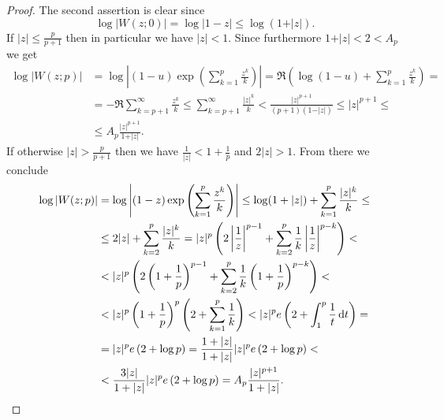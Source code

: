 \begin{proof}
    The second assertion is clear since
    $$ \log \vert W(z; 0) \vert = \log \vert 1 - z \vert \leq \log (1 + \vert z \vert). $$
    If $\vert z \vert \leq \frac{p}{p+1}$ then in particular we have $\vert z \vert < 1$. Since furthermore $1 + \vert z \vert < 2 < A_p$ we get
    \begin{align*}
        \log \vert W(z; p) \vert &= \log \left\vert (1-u) \exp \left( \sum_{k=1}^p \frac{z^k}{k} \right) \right\vert = \Re \left( \log(1-u) + \sum_{k=1}^p \frac{z^k}{k} \right) = \\
        &= -\Re \sum_{k=p+1}^\infty \frac{z^k}{k} \leq \sum_{k=p+1}^\infty \frac{\vert z \vert^k}{k} < \frac{\vert z \vert^{p+1}}{(p+1)(1 - \vert z \vert)} \leq \vert z \vert^{p+1} \leq \\ &\leq A_p \frac{\vert z \vert^{p+1}}{1 + \vert z \vert}.
    \end{align*}
    If otherwise $\vert z \vert > \frac{p}{p+1}$ then we have $\frac{1}{\vert z \vert} < 1 + \frac{1}{p}$ and $2 \vert z \vert > 1$. From there we conclude
    \begin{align*}
        \log \vert W(z; p) \vert &= \log \left\vert (1-z) \exp \left( \sum_{k=1}^p \frac{z^k}{k} \right) \right\vert \leq \log(1 + \vert z \vert) + \sum_{k=1}^p \frac{\vert z \vert^k}{k} \leq \\
        &\leq 2 \vert z \vert + \sum_{k=2}^p \frac{\vert z \vert^k}{k} = \vert z \vert^p \left( 2 \left\vert \frac{1}{z} \right\vert^{p-1} + \sum_{k=2}^p \frac{1}{k} \left\vert \frac{1}{z} \right\vert^{p-k} \right) < \\
        &< \vert z \vert^p \left( 2 \left(1 + \frac{1}{p} \right)^{p-1} + \sum_{k=2}^p \frac{1}{k} \left( 1 + \frac{1}{p} \right)^{p-k} \right) < \\
        &< \vert z \vert^p \left( 1 + \frac{1}{p} \right)^p \left( 2 + \sum_{k=1}^p \frac{1}{k} \right) < \vert z \vert^p e \left( 2 + \int_1^p \frac{1}{t} \mathop{}\!\mathrm{d} t \right) = \\
        &= \vert z \vert^p e \left( 2 + \log p \right) = \frac{1 + \vert z \vert}{1 + \vert z \vert} \vert z \vert^p e \left( 2 + \log p \right) < \\
        &< \frac{3 \vert z \vert}{1 + \vert z \vert} \vert z \vert^p e \left( 2 + \log p \right) = A_p \frac{\vert z \vert^{p+1}}{1 + \vert z \vert}. \qedhere
    \end{align*}
\end{proof}

